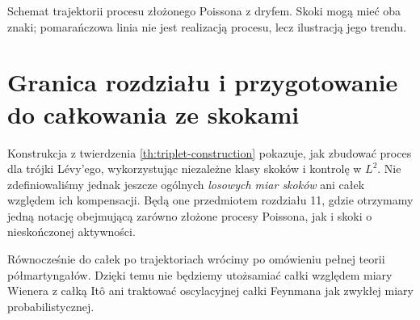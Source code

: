\begin{center}
\par\smallskip\small Schemat trajektorii procesu złożonego Poissona
z dryfem. Skoki mogą mieć oba znaki; pomarańczowa linia
nie jest realizacją procesu, lecz ilustracją jego trendu.
\end{center}

\section{Granica rozdziału i przygotowanie do całkowania ze skokami}
Konstrukcja z twierdzenia \ref{th:triplet-construction}
pokazuje, jak zbudować proces dla trójki Lévy'ego,
wykorzystując niezależne klasy skoków i kontrolę w $L^2$.
Nie zdefiniowaliśmy jednak jeszcze ogólnych \emph{losowych
miar skoków} ani całek względem ich kompensacji.
Będą one przedmiotem rozdziału 11, gdzie otrzymamy
jedną notację obejmującą zarówno złożone procesy Poissona,
jak i skoki o nieskończonej aktywności.

Równocześnie do całek po trajektoriach wrócimy po omówieniu
pełnej teorii półmartyngałów. Dzięki temu nie będziemy
utożsamiać całki względem miary Wienera z całką Itô
ani traktować oscylacyjnej całki Feynmana jak zwykłej
miary probabilistycznej.

